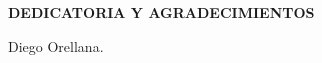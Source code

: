 \newpage
{\LARGE \textbf{DEDICATORIA Y AGRADECIMIENTOS}}\\[2cm]
\begin{center}
Diego Orellana.
\end{center}